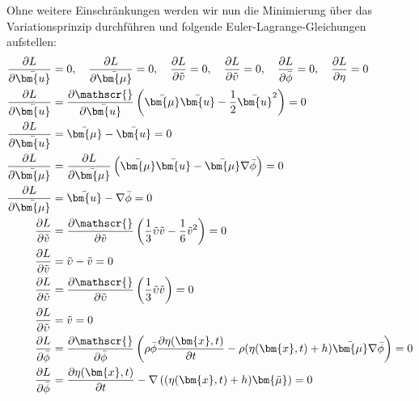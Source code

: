 Ohne weitere Einschränkungen werden wir nun die Minimierung über das Variationsprinzip durchführen und folgende Euler-Lagrange-Gleichungen aufstellen:
\begin{align}
\frac{\partial L}{\partial \bar{\bm{u}}} &= 0
,\quad
\frac{\partial L}{\partial \bar{\bm{\mu}}} = 0
,\quad
\frac{\partial L}{\partial \tilde{v}} = 0
,\quad
\frac{\partial L}{\partial \tilde{\upsilon}} = 0
,\quad
\frac{\partial L}{\partial \bar{\phi}} = 0
,\quad
\frac{\partial L}{\partial \eta} = 0
\notag
\\
	\frac{\partial L}{\partial \bar{\bm{u}}}
	&=
	\frac{\partial \mathscr{}}{\partial \bar{\bm{u}}}\left(\bar{\bm{\mu}}\bar{\bm{u}} - \frac{1}{2} \bar{\bm{u}}^2\right)
	= 0
	\nonumber \\ 
	\frac{\partial L}{\partial \bar{\bm{u}}}
	&=
	\bar{\bm{\mu}} - \bar{\bm{u}}
	= 0
	\label{luke:Variation_nach_u} 
	\\
	\frac{\partial L}{\partial \bar{\bm{\mu}}}
	&=
	\frac{\partial L}{\partial \bar{\bm{\mu}}} \left( \bar{\bm{\mu}}\bar{\bm{u}}-\bar{\bm{\mu}}\nabla \bar{\phi} \right)
	= 0
	\nonumber \\
	\frac{\partial L}{\partial \bar{\bm{\mu}}}
	&=
	\bar{\bm{u}}-\nabla \bar{\phi}
	= 0
	\label{luke:Variation_nach_mu}
	\\
	\frac{\partial L}{\partial \tilde{v}}
	&=
	\frac{\partial \mathscr{}}{\partial \tilde{v}}\left(\frac{1}{3} \tilde{\upsilon}\tilde{v} - \frac{1}{6} \tilde{v}^2\right)
	= 0
	\nonumber \\
	\frac{\partial L}{\partial \tilde{v}}
	&=
	\tilde{\upsilon}-\tilde{v}
	= 0
	\label{luke:Variation_nach_v}
	\\
	\frac{\partial L}{\partial \tilde{\upsilon}}
	&=
	\frac{\partial \mathscr{}}{\partial \tilde{\upsilon}}\left(\frac{1}{3} \tilde{\upsilon}\tilde{v}\right)
	= 0
	\nonumber \\	
	\frac{\partial L}{\partial \tilde{\upsilon}}
	&=
	\tilde{v}
	= 0
	\label{luke:Variation_nach_upsilon}
	\\
	\frac{\partial L}{\partial \bar{\phi}}
	&=
	\frac{\partial \mathscr{}}{\partial \bar{\phi}}\left(
	\rho\bar{\phi}\frac{\partial \eta(\bm{x}, t)}{\partial t}
	-
	\rho(\eta(\bm{x}, t) + h)\bar{\bm{\mu}}\nabla \bar{\phi}
	\right)
	= 0
	\nonumber \\
	\frac{\partial L}{\partial \bar{\phi}}
	&=
	\frac{\partial \eta(\bm{x}, t)}{\partial t} -  \nabla\left((\eta(\bm{x}, t)+ h)\bm{\bar{\mu}}\right)
	= 0
	\label{luke:Variation_nach_phi}

\end{align}

